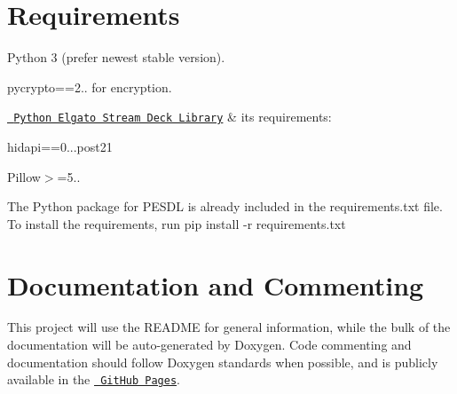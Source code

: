 \section*{Requirements}


\begin{DoxyItemize}
\item Python 3 (prefer newest stable version).
\item pycrypto==2.. for encryption.
\item \href{https://github.com/abcminiuser/python-elgato-streamdeck}{\texttt{ Python Elgato Stream Deck Library}} \& it\textquotesingle{}s requirements\+:
\begin{DoxyItemize}
\item hidapi==0...\+post21
\item Pillow$>$=5..
\end{DoxyItemize}
\end{DoxyItemize}

The Python package for P\+E\+S\+DL is already included in the requirements.\+txt file. To install the requirements, run {\ttfamily pip install -\/r requirements.\+txt}

\section*{Documentation and Commenting}

This project will use the R\+E\+A\+D\+ME for general information, while the bulk of the documentation will be auto-\/generated by Doxygen. Code commenting and documentation should follow Doxygen standards when possible, and is publicly available in the \href{https://hunterap23.github.io/streamdeck_commands-over-network/}{\texttt{ Git\+Hub Pages}}. 